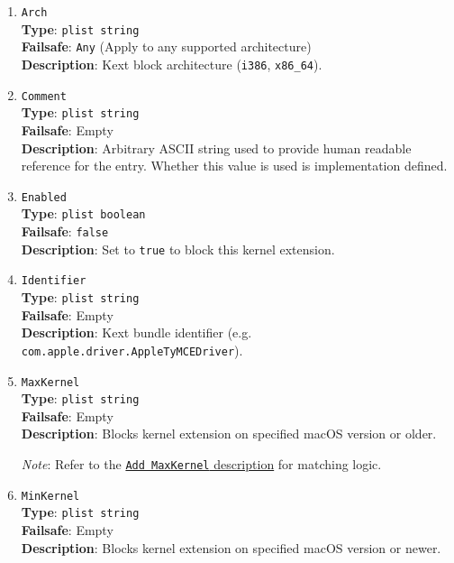 \documentclass[]{article}
\begin{document}
\begin{enumerate}
\item
  \texttt{Arch}\\
  \textbf{Type}: \texttt{plist\ string}\\
  \textbf{Failsafe}: \texttt{Any} (Apply to any supported architecture)\\
  \textbf{Description}: Kext block architecture (\texttt{i386}, \texttt{x86\_64}).

\item
  \texttt{Comment}\\
  \textbf{Type}: \texttt{plist\ string}\\
  \textbf{Failsafe}: Empty\\
  \textbf{Description}: Arbitrary ASCII string used to provide human readable
  reference for the entry. Whether this value is used is implementation defined.

\item
  \texttt{Enabled}\\
  \textbf{Type}: \texttt{plist\ boolean}\\
  \textbf{Failsafe}: \texttt{false}\\
  \textbf{Description}: Set to \texttt{true} to block this kernel extension.

\item
  \texttt{Identifier}\\
  \textbf{Type}: \texttt{plist\ string}\\
  \textbf{Failsafe}: Empty\\
  \textbf{Description}: Kext bundle identifier
    (e.g. \texttt{com.apple.driver.AppleTyMCEDriver}).

\item
  \texttt{MaxKernel}\\
  \textbf{Type}: \texttt{plist\ string}\\
  \textbf{Failsafe}: Empty\\
  \textbf{Description}: Blocks kernel extension on specified macOS version or older.

  \emph{Note}: Refer to the \hyperlink{kernmatch}{\texttt{Add\ MaxKernel} description} for matching logic.

\item
  \texttt{MinKernel}\\
  \textbf{Type}: \texttt{plist\ string}\\
  \textbf{Failsafe}: Empty\\
  \textbf{Description}: Blocks kernel extension on specified macOS version or newer.


\end{enumerate}
\end{document}

